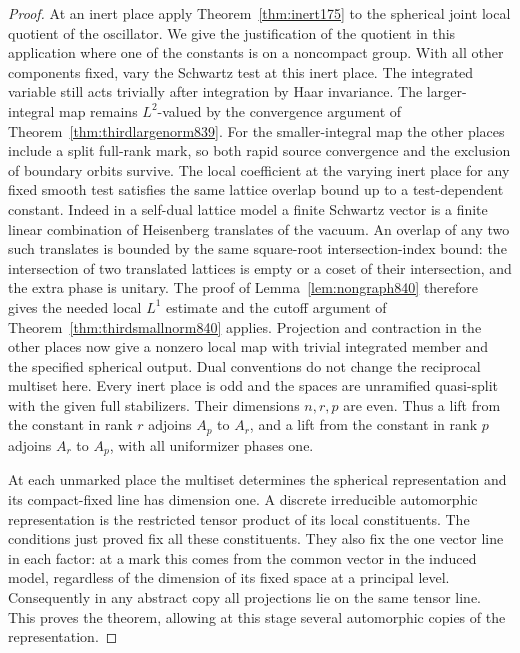 \documentclass[a4paper,11pt]{article}
\theoremstyle{definition}
\theoremstyle{remark}
\numberwithin{equation}{section}
\begin{document}
\begin{proof}
At an inert place apply Theorem~\ref{thm:inert175} to the
spherical joint local quotient of the oscillator. We give
the justification of the quotient in this application where
one of the constants is on a noncompact group. With all
other components fixed, vary the Schwartz test at this
inert place. The integrated variable still acts trivially
after integration by Haar invariance. The larger-integral
map remains \(L^2\)-valued by the convergence argument of
Theorem~\ref{thm:thirdlargenorm839}. For the smaller-integral
map the other places include a split full-rank mark, so
both rapid source convergence and the exclusion of boundary
orbits survive. The local coefficient at the varying inert
place for any fixed smooth test satisfies the same lattice
overlap bound up to a test-dependent constant. Indeed in a
self-dual lattice model a finite Schwartz vector is a finite
linear combination of Heisenberg translates of the vacuum.
An overlap of any two such translates is bounded by the
same square-root intersection-index bound: the intersection
of two translated lattices is empty or a coset of their
intersection, and the extra phase is unitary. The proof of
Lemma~\ref{lem:nongraph840} therefore gives the needed local
\(L^1\) estimate and the cutoff argument of
Theorem~\ref{thm:thirdsmallnorm840} applies. Projection and
contraction in the other places now give a nonzero local
map with trivial integrated member and the specified
spherical output. Dual conventions do not change the
reciprocal multiset here. Every inert place is odd and the
spaces are unramified quasi-split with the given full
stabilizers. Their dimensions \(n,r,p\) are even. Thus a
lift from the constant in rank \(r\) adjoins \(A_p\) to
\(A_r\), and a lift from the constant in rank \(p\) adjoins
\(A_r\) to \(A_p\), with all uniformizer phases one.

At each unmarked place the multiset determines the spherical
representation and its compact-fixed line has dimension one.
A discrete irreducible automorphic representation is the
restricted tensor product of its local constituents. The
conditions just proved fix all these constituents. They
also fix the one vector line in each factor: at a mark this
comes from the common vector in the induced model, regardless
of the dimension of its fixed space at a principal level.
Consequently in any abstract copy all projections lie on
the same tensor line. This proves the theorem, allowing at
this stage several automorphic copies of the representation.
\end{proof}
\clearpage
\end{document}
